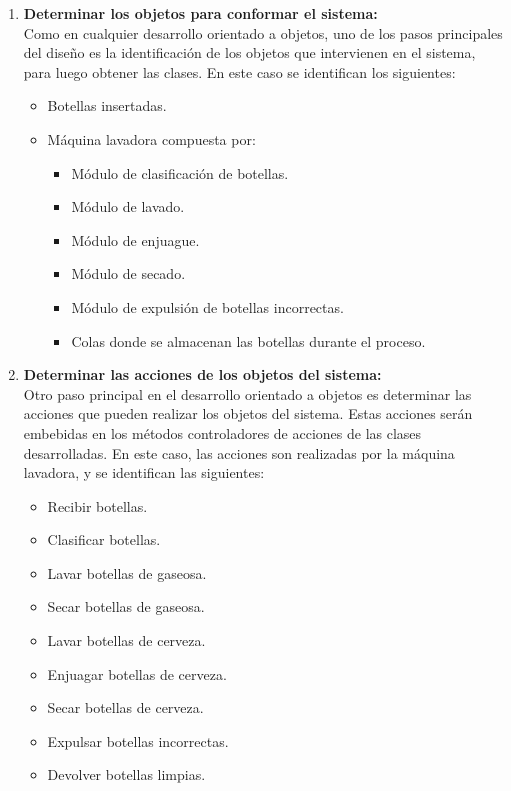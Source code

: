 \begin{enumerate}
\item \textbf{Determinar los objetos para conformar el sistema:}\\
        Como en cualquier desarrollo orientado a objetos, uno de los pasos principales
        del diseño es la identificación de los objetos que intervienen en el sistema,
        para luego obtener las clases.
        En este caso se identifican los siguientes:
            \begin{itemize}
              \item Botellas insertadas.
              \item Máquina lavadora compuesta por:
              \begin{itemize}
                  \item Módulo de clasificación de botellas.
                  \item Módulo de lavado.
                  \item Módulo de enjuague.
                  \item Módulo de secado.
                  \item Módulo de expulsión de botellas incorrectas.
                  \item Colas donde se almacenan las botellas durante el proceso.
              \end{itemize}
            \end{itemize}

\item \textbf{Determinar las acciones de los objetos del sistema:}\\
            Otro paso principal en el desarrollo orientado a objetos es determinar las
            acciones que pueden realizar los objetos del sistema. Estas acciones serán
            embebidas en los métodos controladores de acciones de las clases
            desarrolladas.
            En este caso, las acciones son realizadas por la máquina lavadora, y se
            identifican las siguientes:
            \begin{itemize}
              \item Recibir botellas.
              \item Clasificar botellas.
              \item Lavar botellas de gaseosa.
              \item Secar botellas de gaseosa.
              \item Lavar botellas de cerveza.
              \item Enjuagar botellas de cerveza.
              \item Secar botellas de cerveza.
              \item Expulsar botellas incorrectas.
              \item Devolver botellas limpias.
            \end{itemize}


\end{enumerate}
